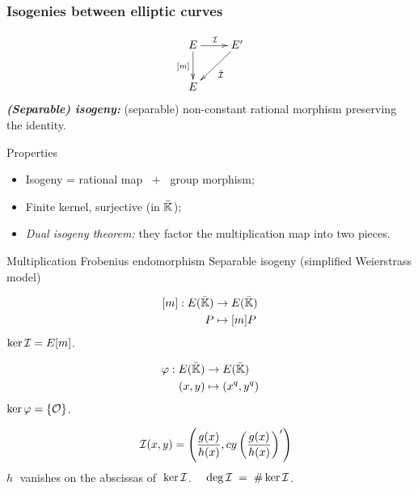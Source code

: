\documentclass[10pt,usepdftitle=false]{beamer}
\begin{document}

\begin{frame}
  \frametitle{Isogenies between elliptic curves}
  
  \vspace{-5mm}

  {\large \[\xymatrix{E\ar[d]_{[m]}\ar[r]^{\I} & E'\ar[dl]^{\hat{\I}}\\E}\]} 
  \emph{\textbf{(Separable) isogeny:}} (separable)
  non-constant rational morphism preserving the identity.
  
  \begin{block}{Properties}
    \begin{itemize}
    \item Isogeny = rational map $\;+\;$ group morphism;
    \item Finite kernel, surjective (in $\bar{\mathbb{K}}$);
    \item \emph{Dual isogeny theorem:} they factor the multiplication map into two pieces.
    \end{itemize}
  \end{block}

  \vspace{-1mm}

  \begin{block}{
	\begin{overprint}
	 Multiplication	
	\onslide<2> Frobenius endomorphism
	\onslide<3> Separable isogeny (simplified Weierstrass model)
	\end{overprint}
      }
    \begin{overprint}
      \[\begin{aligned}
	{}[m] : E(\bar{\mathbb{K}}) &\rightarrow E(\bar{\mathbb{K}})\\
	                   P &\mapsto [m]P
      \end{aligned}\]
      $\ker\mathcal{I} = E[m]$.

      \[\begin{aligned}
	\varphi : E(\bar{\mathbb{K}}) &\rightarrow E(\bar{\mathbb{K}})\\
	               (x,y) &\mapsto (x^q,y^q)
      \end{aligned}\]
      $\ker\varphi = \{\mathcal{O}\}$.

      \[\quad\mathcal{I}(x,y) = \left(\frac{g(x)}{h(x)},
      cy\left(\frac{g(x)}{h(x)}\right)'\right)\]
      $h\;$ vanishes on the abscissas of $\;\ker\mathcal{I}$. \emph{$\quad\deg\mathcal{I} \;=\; \# \ker\mathcal{I}$}.
    \end{overprint}
  \end{block}  
\end{frame}
\end{document}
